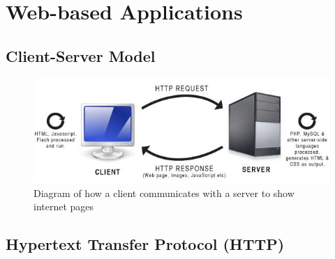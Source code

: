 \chapter{Web-based Applications}

\section{Client-Server Model}
    \begin{figure}[h]
        \centering
        \includegraphics[width=0.7\linewidth]{images/client-server-model.jpg}
        \caption{Diagram of how a client communicates with a server to show internet pages}
    \end{figure}

\section{Hypertext Transfer Protocol (HTTP)}